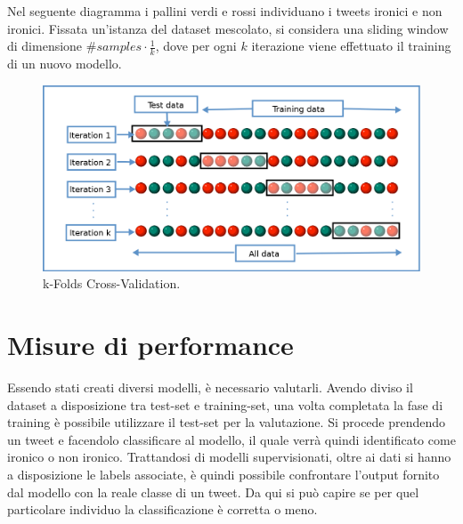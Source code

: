 \documentclass[oneside]{book}
\begin{document}
Nel seguente diagramma i pallini verdi e rossi individuano i tweets ironici e non ironici. Fissata un'istanza del dataset mescolato, si considera una sliding window di dimensione $\#samples \cdot \frac{1}{k}$, dove per ogni $k$ iterazione viene effettuato il training di un nuovo modello.

\begin{figure}[!h]
	\centering
	\includegraphics[width=13cm]{assets/cross-validation.png}
	\caption[Caption for LOF]{k-Folds Cross-Validation.\footnotemark}
	\label{fig:cross-validation}
\end{figure}




\section{Misure di performance}
Essendo stati creati diversi modelli, è necessario valutarli. Avendo diviso il dataset a disposizione tra test-set e training-set, una volta completata la fase di training è possibile utilizzare il test-set per la valutazione. Si procede prendendo un tweet e facendolo classificare al modello, il quale verrà quindi identificato come ironico o non ironico. Trattandosi di modelli supervisionati, oltre ai dati si hanno a disposizione le labels associate, è quindi possibile confrontare l'output fornito dal modello con la reale classe di un tweet. Da qui si può capire se per quel particolare individuo la classificazione è corretta o meno.
\end{document}
